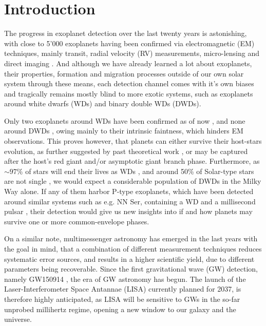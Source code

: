 \documentclass{aa}
\begin{document}

   \maketitle
%

\section{Introduction}

The progress in exoplanet detection over the last twenty years is astonishing, with close to 5'000 exoplanets having been confirmed via electromagnetic (EM) techniques, mainly transit, radial velocity (RV) measurements, micro-lensing and direct imaging \citep{Exo_NASA}. And although we have already learned a lot about exoplanets, their properties, formation and migration processes outside of our own solar system through these means, each detection channel comes with it's own biases and tragically remains mostly blind to more exotic systems, such as exoplanets around white dwarfs (WDs) and binary double WDs (DWDs). 

Only two exoplanets around WDs have been confirmed as of now \citep{vanderburg2020,luhman2011,Exo_NASA}, and none around DWDs \citep{tamanini}, owing mainly to their intrinsic faintness, which hinders EM observations. This proves however, that planets can either survive their host-stars evolution, as further suggested by past theoretical work \citep{duncan1998}, or may be captured after the host's red giant and/or asymptotic giant branch phase. Furthermore, as $\sim 97\%$ of stars will end their lives as WDs \citep{althaus2010}, and around 50\% of Solar-type stars are not single \citep{duchene2013}, we would expect a considerable population of DWDs in the Milky Way alone. If any of them harbor P-type exoplanets, which have been detected around similar systems such as e.g. NN Ser, containing a WD and a millisecond pulsar \citep{beuermann2011}, their detection would give us new insights into if and how planets may survive one or more common-envelope phases.

On a similar note, multimessenger astronomy has emerged in the last years with the goal in mind, that a combination of different measurement techniques reduces systematic error sources, and results in a higher scientific yield, due to different parameters being recoverable. Since the first gravitational wave (GW) detection, namely GW150914 \citep{abbott2016}, the era of GW astronomy has begun. The launch of the Laser-Interferometer Space Antannae (LISA) currently planned for 2037, is therefore highly anticipated, as LISA will be sensitive to GWs in the so-far unprobed millihertz regime, opening a new window to our galaxy and the universe. 
\end{document}
